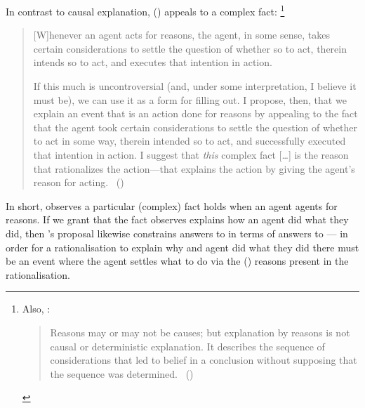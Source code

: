 \begin{note}
  In contrast to causal explanation, \citeauthor{Hieronymi:2011aa} (\citeyear{Hieronymi:2011aa}) appeals to a complex fact:%
  \footnote{
    Also, \citeauthor{Harman:1973ww}:
    \begin{quote}
    Reasons may or may not be causes; but explanation by reasons is not causal or deterministic explanation.
    It describes the sequence of considerations that led to belief in a conclusion without supposing that the sequence was determined.%
    \mbox{ }\hfill\mbox{(\citeyear[52]{Harman:1973ww})}
  \end{quote}
  }
  \begin{quote}
    [W]henever an agent acts for reasons, the agent, in some sense, takes certain considerations to settle the question of whether so to act, therein intends so to act, and executes that intention in action.

    If this much is uncontroversial (and, under some interpretation, I believe it must be), we can use it as a form for filling out.
    I propose, then, that we explain an event that is an action done for reasons by appealing to the fact that the agent took certain considerations to settle the question of whether to act in some way, therein intended so to act, and successfully executed that intention in action.
    I suggest that \emph{this} complex fact [\dots] is the reason that rationalizes the action---that explains the action by giving the agent's reason for acting.%
    \mbox{ }\hfill\mbox{(\citeyear[421]{Hieronymi:2011aa})}
  \end{quote}
  In short, \citeauthor{Hieronymi:2011aa} observes a particular (complex) fact holds when an agent agents for reasons.
  If we grant that the fact \citeauthor{Hieronymi:2011aa} observes explains how an agent did what they did, then \citeauthor{Hieronymi:2011aa}'s proposal likewise constrains answers to \qWhyR{} in terms of answers to \qHowR{} --- in order for a rationalisation to explain why and agent did what they did there must be an event where the agent settles what to do via the (\agents{}) reasons present in the rationalisation.
\end{note}

